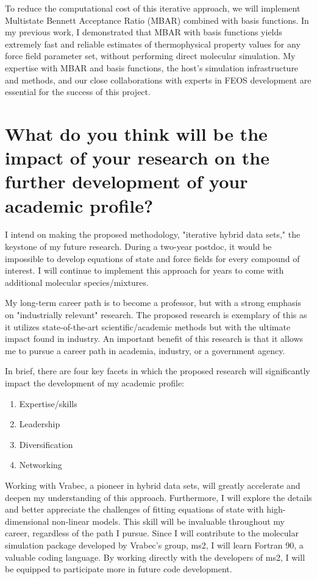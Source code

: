 \documentclass[12pt]{article}
\begin{document}
	To reduce the computational cost of this iterative approach, we will implement Multistate Bennett Acceptance Ratio (MBAR) combined with basis functions. In my previous work, I demonstrated that MBAR with basis functions yields extremely fast and reliable estimates of thermophysical property values for any force field parameter set, without performing direct molecular simulation. My expertise with MBAR and basis functions, the host's simulation infrastructure and methods, and our close collaborations with experts in FEOS development are essential for the success of this project.
	
	\section*{What do you think will be the impact of your research on the further development of your academic profile?}
	
I intend on making the proposed methodology, "iterative hybrid data sets," the keystone of my future research. During a two-year postdoc, it would be impossible to develop equations of state and force fields for every compound of interest. I will continue to implement this approach for years to come with additional molecular species/mixtures.

My long-term career path is to become a professor, but with a strong emphasis on "industrially relevant" research. The proposed research is exemplary of this as it utilizes state-of-the-art scientific/academic methods but with the ultimate impact found in industry. An important benefit of this research is that it allows me to pursue a career path in academia, industry, or a government agency.

In brief, there are four key facets in which the proposed research will significantly impact the development of my academic profile:

\begin{enumerate}
	\item Expertise/skills
	\item Leadership
	\item Diversification
	\item Networking
\end{enumerate}

Working with Vrabec, a pioneer in hybrid data sets, will greatly accelerate and deepen my understanding of this approach. Furthermore, I will explore the details and better appreciate the challenges of fitting equations of state with high-dimensional non-linear models. This skill will be invaluable throughout my career, regardless of the path I pursue. Since I will contribute to the molecular simulation package developed by Vrabec's group, ms2, I will learn Fortran 90, a valuable coding language. By working directly with the developers of ms2, I will be equipped to participate more in future code development.
\end{document}
